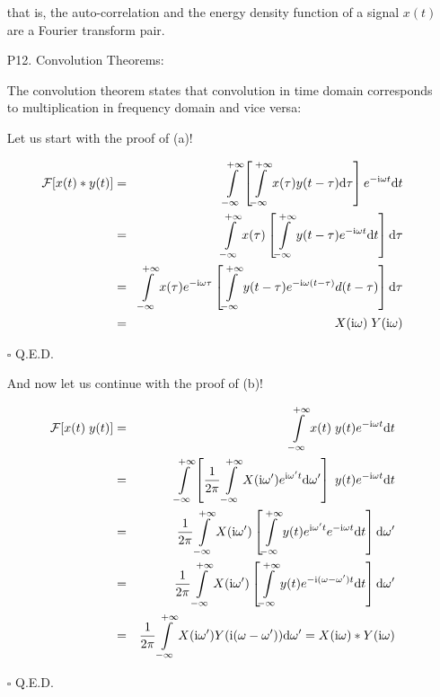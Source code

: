 \begin{itemize}
	that is, the auto-correlation and the energy density function of a signal
	$x(t)$ are a Fourier transform pair.
	
	\item[P12.] Convolution Theorems:
	
	The convolution theorem states that convolution in time domain 
	corresponds to multiplication in frequency domain and vice versa:
	
	
	Let us start with the proof of (a)!
	
	\begin{dem}
	\begin{eqnarray}
	{\cal F}[x(t)*y(t)]&=&\int\limits_{-\infty}^{+\infty} \left[ \int\limits_{-\infty}^{+\infty} 
		x(\tau)y(t-\tau)\mathrm{d}\tau\right] e^{-\mathrm{i}\omega t} \mathrm{d}t
		\nonumber \\
	&=& \int\limits_{-\infty}^{+\infty} x(\tau) \left[ \int\limits_{-\infty}^{+\infty} 
		y(t-\tau) e^{-\mathrm{i}\omega t} \mathrm{d}t\right] \mathrm{d}\tau 
		\nonumber \\
	&=& \int\limits_{-\infty}^{+\infty} x(\tau) e^{-\mathrm{i}\omega \tau}\left[ \int\limits_{-\infty}^{+\infty} 
		y(t-\tau) e^{-\mathrm{i}\omega(t-\tau)} d(t-\tau)\right] \mathrm{d}\tau 
		\nonumber \\
	&=& X(\mathrm{i}\omega) \; Y(\mathrm{i}\omega)
		\nonumber
	\end{eqnarray}
	\begin{flushright}
		$\square$  Q.E.D.
	\end{flushright}
	\end{dem}
	And now let us continue with the proof of (b)!

	\begin{dem}
	\begin{eqnarray}
	{\cal F}[x(t)\;y(t)]&=&\int\limits_{-\infty}^{+\infty} x(t)\;y(t) e^{-\mathrm{i}\omega t} \mathrm{d}t
		\nonumber \\
	&=& \int\limits_{-\infty}^{+\infty} \left[\frac{1}{2\pi}\int\limits_{-\infty}^{+\infty} 
		X(\mathrm{i}\omega') e^{\mathrm{i}\omega't} \mathrm{d}\omega'\right] \; y(t) e^{-\mathrm{i}\omega t} \mathrm{d}t
		\nonumber \\
	&=& \frac{1}{2\pi}\int\limits_{-\infty}^{+\infty} X(\mathrm{i}\omega') \left[ \int\limits_{-\infty}^{+\infty} 
		y(t) e^{\mathrm{i}\omega't} e^{-\mathrm{i}\omega t} \mathrm{d}t\right] \mathrm{d}\omega' 
		\nonumber \\
	&=& \frac{1}{2\pi}\int\limits_{-\infty}^{+\infty} X(\mathrm{i}\omega') \left[\int\limits_{-\infty}^{+\infty} 
		y(t) e^{-\mathrm{i}(\omega-\omega')t} \mathrm{d}t\right] \mathrm{d}\omega' 
		\nonumber \\
	&=& \frac{1}{2\pi}\int\limits_{-\infty}^{+\infty} X(\mathrm{i}\omega') Y(\mathrm{i}(\omega-\omega')) \mathrm{d}\omega' 
		= X(\mathrm{i}\omega) * Y(\mathrm{i}\omega)
		\nonumber
	\end{eqnarray}
	\begin{flushright}
		$\square$  Q.E.D.
	\end{flushright}
	\end{dem}
	

\end{itemize}
